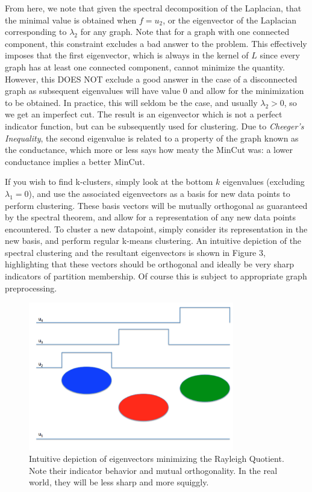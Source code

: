 From here, we note that given the spectral decomposition of the
Laplacian, that the minimal value is obtained when \(f = u_2\), or the
eigenvector of the Laplacian corresponding to \(\lambda_2\) for any
graph. Note that for a graph with one connected component, this
constraint excludes a bad answer to the problem. This effectively
imposes that the first eigenvector, which is always in the kernel of
\(L\) since every graph has at least one connected component, cannot
minimize the quantity. However, this DOES NOT exclude a good answer in
the case of a disconnected graph as subsequent eigenvalues will have
value 0 and allow for the minimization to be obtained.  In practice,
this will seldom be the case, and usually \(\lambda_2 > 0\), so we get
an imperfect cut. The result is an eigenvector which is not a perfect
indicator function, but can be subsequently used for clustering. Due
to \textit{Cheeger's Inequality}, the second eigenvalue is related to
a property of the graph known as the conductance, which more or less
says how meaty the MinCut was: a lower conductance implies a better
MinCut. 

If you wish to find k-clusters, simply look at the bottom \(k\)
eigenvalues (excluding \(\lambda_1 = 0\)), and use the associated
eigenvectors as a basis for new data points to perform
clustering. These basis vectors will be mutually orthogonal as
guaranteed by the spectral theorem, and allow for a representation of
any new data points encountered. To cluster a new datapoint, simply
consider its representation in the new basis, and perform regular
k-means clustering. An intuitive depiction of the spectral clustering
and the resultant eigenvectors is shown in Figure 3, highlighting that
these vectors should be orthogonal and ideally be very sharp
indicators of partition membership. Of course this is subject to
appropriate graph preprocessing. 
\begin{figure}[ht]
\centering
\includegraphics[width=0.8\textwidth, height=0.3\textheight]{chapter_3/files/cluster.png}
\caption{Intuitive depiction of eigenvectors minimizing the Rayleigh
  Quotient. Note their indicator behavior and mutual orthogonality. In
  the real world, they will be less sharp and more squiggly.} 
\label{fig:circle}
\end{figure}
